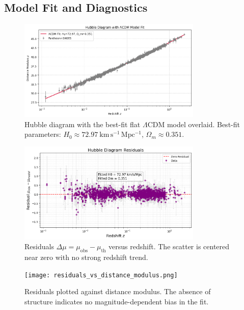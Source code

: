 \documentclass[12pt]{article}
\begin{document}
\subsection{Model Fit and Diagnostics}
\begin{figure}[H]
    \centering
    \includegraphics[width=0.78\textwidth]{cdm_fit.png}
    \caption{Hubble diagram with the best-fit flat $\Lambda$CDM model overlaid. Best-fit parameters: $H_0 \approx 72.97\ \mathrm{km\,s^{-1}\,Mpc^{-1}}$, $\Omega_m \approx 0.351$.}
    \label{fig:lcdm_fit}
\end{figure}

\begin{figure}[H]
    \centering
    \includegraphics[width=0.78\textwidth]{hubble_residuals.png}
    \caption{Residuals $\Delta\mu=\mu_{\mathrm{obs}}-\mu_{\mathrm{th}}$ versus redshift. The scatter is centered near zero with no strong redshift trend.}
    \label{fig:resid_z}
\end{figure}

\begin{figure}[H]
    \centering
    \texttt{[image: residuals\_vs\_distance\_modulus.png]}
    \caption{Residuals plotted against distance modulus. The absence of structure indicates no magnitude-dependent bias in the fit.}
    \label{fig:resid_mu}
\end{figure}
\end{document}

